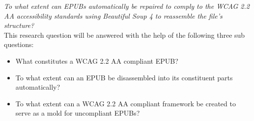 \noindent\textit{To what extent can EPUBs automatically be repaired to comply to the WCAG 2.2 AA accessibility standards using Beautiful Soup 4 to reassemble the file's structure?} \\

\noindent This research question will be answered with the help of the following three sub questions:
\begin{itemize}
    \item What constitutes a WCAG 2.2 AA compliant EPUB?
    \item To what extent can an EPUB be disassembled into its constituent parts automatically?
    \item To what extent can a WCAG 2.2 AA compliant framework be created to serve as a mold for uncompliant EPUBs?
\end{itemize}